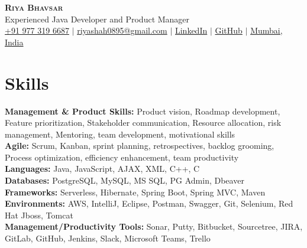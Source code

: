 \documentclass[letterpaper,11pt]{article}
\newcommand{\resumeSubHeadingListStart}{\begin{itemize}[leftmargin=0.15in, label={}]}
\newcommand{\resumeSubHeadingListEnd}{\end{itemize}}
\begin{document}

\begin{center}
  \textbf{\Huge \scshape Riya Bhavsar} \\ \vspace{3pt}
  \normalsize Experienced Java Developer and Product Manager \\ \vspace{3pt}
  \small
  \faMobile \hspace{.5pt} \href{tel:9773196687}{+91 977 319 6687}
  $|$
  \faAt \hspace{.5pt} \href{mailto:riyashah0895@gmail.com}{riyashah0895@gmail.com}
  $|$
  \faLinkedinSquare \hspace{.5pt} \href{https://www.linkedin.com/in/riya-j-bhavsar/}{LinkedIn}
  $|$
  \faGithub \hspace{.5pt} \href{https://github.com/riya-bhavsar}{GitHub}
  $|$
  \faMapMarker \hspace{.5pt} \href{https://goo.gl/maps/Czh1vXePukiKumpu5}{Mumbai, India}
\end{center}



\section{Skills}
\vspace{2pt}
\resumeSubHeadingListStart
\small{\item{
  \textbf{Management \& Product Skills:}{ Product vision, Roadmap development, Feature prioritization, Stakeholder communication, Resource allocation, risk management, Mentoring, team development, motivational skills} \\ \vspace{3pt}
  \textbf{Agile:}{ Scrum, Kanban, sprint planning, retrospectives, backlog grooming, Process optimization, efficiency enhancement, team productivity} \\ \vspace{3pt}
  \textbf{Languages:}{ Java, JavaScript, AJAX, XML, C++, C } \\ \vspace{3pt}
  \textbf{Databases:}{ PostgreSQL, MySQL, MS SQL, PG Admin, Dbeaver } \\ \vspace{3pt}
  \textbf{Frameworks:}{ Serverless, Hibernate, Spring Boot, Spring MVC, Maven } \\ \vspace{3pt}
  \textbf{Environments:}{ AWS, IntelliJ, Eclipse, Postman, Swagger, Git, Selenium, Red Hat Jboss, Tomcat } \\ \vspace{3pt}
  \textbf{Management/Productivity Tools:}{ Sonar, Putty, Bitbucket, Sourcetree, JIRA, GitLab, GitHub, Jenkins, Slack, Microsoft Teams, Trello } \\ \vspace{3pt}
}}
\resumeSubHeadingListEnd
\end{document}
